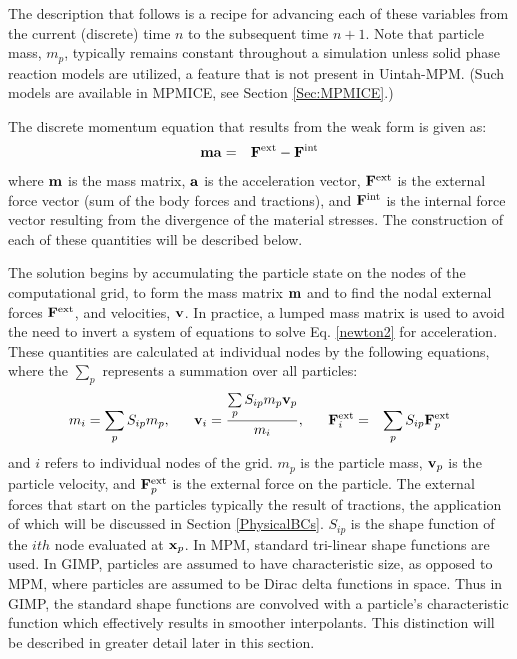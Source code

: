 The description that follows is a recipe for advancing each of these
variables from the current (discrete) time $n$ to the subsequent
time $n+1$.  Note that particle mass, $m_p$, typically remains constant
throughout a simulation unless solid phase reaction models are utilized,
a feature that is not present in Uintah-MPM.  (Such models are available
in MPMICE, see Section \ref{Sec:MPMICE}.)

The discrete momentum equation that results from the weak form is given as:
\begin{eqnarray}
        \bfm \bfa &=& \bfF^{\rm{ext}} - \bfF^{\rm{int}}  \label{newton2}
\end{eqnarray}
where $\bfm$ is the mass matrix, $\bfa$ is the acceleration vector,
$\bfF^{\rm{ext}}$ is the external force vector (sum of the body forces and
tractions), and $\bfF^{\rm{int}}$ is the internal force vector resulting from
the divergence of the material stresses.  The construction of each of these
quantities will be described below.

The solution begins by accumulating the particle state on the
nodes of the computational grid, to form the mass matrix $\bfm$ and to find
the nodal external forces $\bfF^{\rm{ext}}$, and velocities,
$\bfv$.  In practice, a lumped mass matrix is used to avoid the need to
invert a system of equations to solve Eq. \ref{newton2} for acceleration.
These quantities are calculated at individual nodes by the following equations, where the
$\sum\limits_{p}$ represents a summation over all particles:
\begin{eqnarray}
m_i = \sum_{p} S_{ip} m_p,  \;\;\;\;\;\; 
\bfv_i = \frac{\sum\limits_{p} S_{ip} m_p \bfv_p}{m_i},  \;\;\;\;\;\;
\bfF^{\rm{ext}}_i &=& \sum_{p} S_{ip} \bfF^{\rm{ext}}_p
\label{interpolate}
\end{eqnarray}
and $i$ refers to individual nodes of the grid.  $m_p$ is the particle
mass, $\bfv_p$ is the particle velocity, and $\bfF^{\rm{ext}}_p$ is the
external force on the particle.  The external forces that start on the
particles typically the result of tractions, the application of which will
be discussed in Section \ref{PhysicalBCs}.
$S_{ip}$ is the shape function of the $ith$ node evaluated at $\bfx_p$.
In MPM, standard tri-linear shape functions are used. In GIMP\cite{bardgimp},
particles are assumed to have characteristic size, as opposed to MPM,
where particles are assumed to be Dirac delta functions in space.  Thus in
GIMP, the standard shape functions are convolved with a particle's
characteristic function which effectively results in smoother interpolants.
This distinction will be described in greater detail later in this section.


